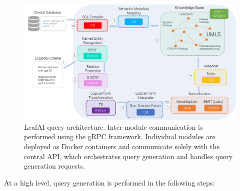 \documentclass[../main.tex]{subfiles}
\begin{document}
\begin{figure}[h]
  \includegraphics[scale=0.5]{Figures/7_query_generation/leafai_architecture.pdf}  
\caption{LeafAI query architecture. Inter-module communication is performed using the gRPC framework. Individual modules are deployed as Docker containers and communicate solely with the central API, which orchestrates query generation and handles query generation requests.}
\label{fig_leafai_architecture}
\end{figure}

At a high level, query generation is performed in the following steps:
\end{document}
